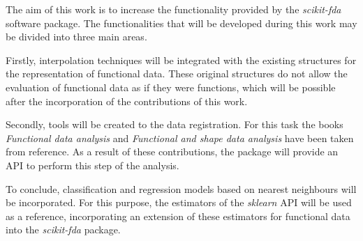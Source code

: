 

The aim of this work is to increase the functionality provided by the
\textit{scikit-fda} software package. The functionalities that will
be developed during this work may be divided into three main areas.

Firstly, interpolation techniques will be integrated with the existing
structures for the representation of functional data. These original structures
do not allow the evaluation of functional data as if they were functions,
which will be possible after the incorporation of the contributions of this work.

Secondly, tools will be created to the data registration. For this task
the books \textit{Functional data analysis}\cite{Ramsay2005} and
\textit{Functional and shape data analysis}\cite{Srivastava2016} have been taken from
reference. As a result of these contributions, the package will provide an \acs{API}
to perform this step of the analysis.

To conclude, classification and regression models based on nearest neighbours
will be incorporated. For this purpose,
the estimators of the \textit{sklearn}\cite{sklearn} \acs{API} will be used as a reference,
incorporating an extension of these estimators for functional data
into the \textit{scikit-fda} package.
